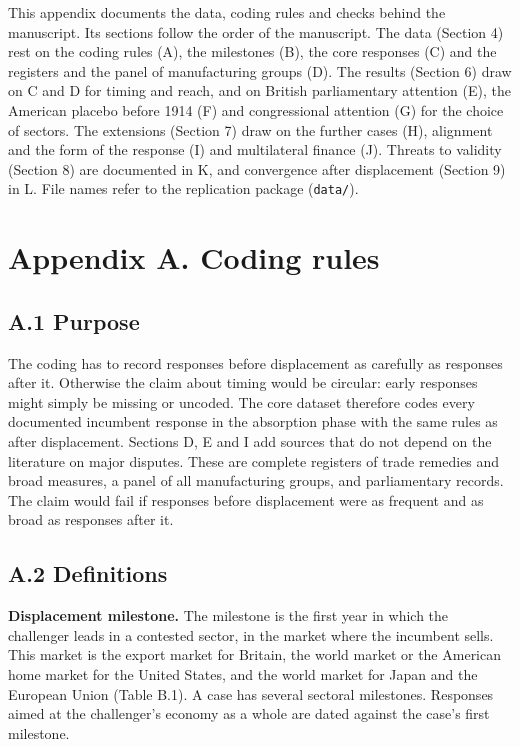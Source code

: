 This appendix documents the data, coding rules and checks behind the
manuscript. Its sections follow the order of the manuscript. The data
(Section 4) rest on the coding rules (A), the milestones (B), the core
responses (C) and the registers and the panel of manufacturing groups
(D). The results (Section 6) draw on C and D for timing and reach, and
on British parliamentary attention (E), the American placebo before 1914
(F) and congressional attention (G) for the choice of sectors. The
extensions (Section 7) draw on the further cases (H), alignment and the
form of the response (I) and multilateral finance (J). Threats to
validity (Section 8) are documented in K, and convergence after
displacement (Section 9) in L. File names refer to the replication
package (\texttt{data/\allowbreak{}}).

\hypertarget{a.-coding-rules}{%
\section*{Appendix A. Coding rules}\label{a.-coding-rules}}

\hypertarget{a.1-purpose}{%
\subsection*{A.1 Purpose}\label{a.1-purpose}}

The coding has to record responses before displacement as carefully as
responses after it. Otherwise the claim about timing would be circular:
early responses might simply be missing or uncoded. The core dataset
therefore codes every documented incumbent response in the absorption
phase with the same rules as after displacement. Sections D, E and I add
sources that do not depend on the literature on major disputes. These
are complete registers of trade remedies and broad measures, a panel of
all manufacturing groups, and parliamentary records. The claim would
fail if responses before displacement were as frequent and as broad as
responses after it.

\hypertarget{a.2-definitions}{%
\subsection*{A.2 Definitions}\label{a.2-definitions}}

\textbf{Displacement milestone.} The milestone is the first year in
which the challenger leads in a contested sector, in the market where
the incumbent sells. This market is the export market for Britain, the
world market or the American home market for the United States, and the
world market for Japan and the European Union (Table B.1). A case has
several sectoral milestones. Responses aimed at the challenger's economy
as a whole are dated against the case's first milestone.

